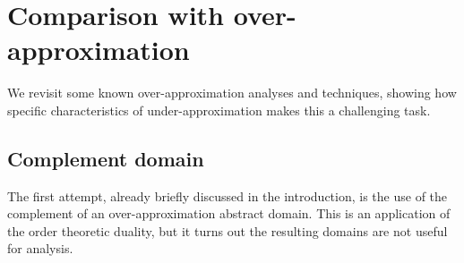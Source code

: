 \section{Comparison with over-approximation}\label{sec:uai:examples}
We revisit some known over-approximation analyses and techniques, showing how specific characteristics of under-approximation makes this a challenging task.

\subsection*{Complement domain}
The first attempt, already briefly discussed in the introduction, is the use of the complement of an over-approximation abstract domain. This is an application of the order theoretic duality, but it turns out the resulting domains are not useful for analysis.

